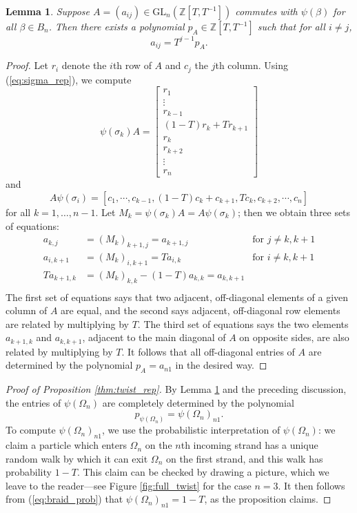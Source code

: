 \documentclass[11pt,hyp,]{nyjm}
\newcommand{\Z}{\mathbb{Z}}
\numberwithin{thm}{section}
\newtheorem{lemma}[thm]{Lemma}
\theoremstyle{definition}
\theoremstyle{remark}
\begin{document}
	\begin{lemma}
		\label{thm:central_rep}
		Suppose $A = (a_{ij}) \in \text{GL}_n(\Z[T,T^{-1}])$ commutes with $\psi(\beta)$ for all $\beta \in B_n$. Then there exists a polynomial $p_A \in \Z[T,T^{-1}]$ such that for all $i \neq j$,
		$$
		a_{ij} = T^{j - 1}p_A.
		$$
	\end{lemma}

	\begin{proof}
		Let $r_i$ denote the $i$th row of $A$ and $c_j$ the $j$th column. Using (\ref{eq:sigma_rep}), we compute
		$$
		\psi(\sigma_k)A = \begin{bmatrix}
			r_1 \\
			\vdots \\
			r_{k - 1} \\
			(1 - T)r_k + Tr_{k + 1} \\
			r_k \\
			r_{k + 2}\\
			\vdots \\
			r_n
		\end{bmatrix}
		$$
		and
		$$
		A \psi(\sigma_i) = [c_1, \cdots, c_{k - 1}, (1 - T)c_k + c_{k + 1}, Tc_k, c_{k + 2}, \cdots, c_n]
		$$ 
		for all $k = 1, \dots, n - 1$. Let $M_k = \psi(\sigma_k)A = A \psi(\sigma_k)$; then we obtain three sets of equations:
		\begin{align*}
			a_{k,j} &= (M_k)_{k+1,j} = a_{k + 1,j} &\text{for } j \neq k, k + 1 \\
			a_{i,k+1} &= (M_k)_{i,k+1} = Ta_{i,k} &\text{for } i \neq k, k + 1 \\
			Ta_{k+1,k} &= (M_k)_{k,k} - (1 - T)a_{k,k} = a_{k,k+1} \\
		\end{align*}
		The first set of equations says that two adjacent, off-diagonal elements of a given column of $A$ are equal, and the second says adjacent, off-diagonal row elements are related by multiplying by $T$. The third set of equations says the two elements $a_{k + 1,k}$ and $a_{k,k + 1}$, adjacent to the main diagonal of $A$ on opposite sides, are also related by multiplying by $T$. It follows that all off-diagonal entries of $A$ are determined by the polynomial $p_A = a_{n1}$ in the desired way.
	\end{proof}

	\begin{proof}[Proof of Proposition \protect\ref{thm:twist_rep}]
		By Lemma \ref{thm:central_rep} and the preceding discussion, the entries of $\psi(\Omega_n)$ are completely determined by the polynomial
		$$
		p_{\psi(\Omega_n)} = \psi(\Omega_n)_{n1}.
		$$
		To compute $\psi(\Omega_n)_{n1}$, we use the probabilistic interpretation of $\psi(\Omega_n)$: we claim a particle which enters $\Omega_n$ on the $n$th incoming strand has a unique random walk by which it can exit $\Omega_n$ on the first strand, and this walk has probability $1 - T$. This claim can be checked by drawing a picture, which we leave to the reader---see Figure \ref{fig:full_twist} for the case $n = 3$. It then follows from (\ref{eq:braid_prob}) that $\psi(\Omega_n)_{n1} = 1 - T$, as the proposition claims.
	\end{proof}
\end{document}
